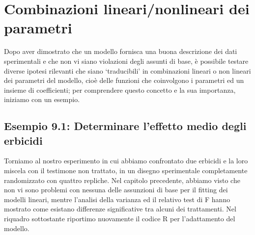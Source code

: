 \documentclass[
  12pt,
]{book}
\begin{document}
\hypertarget{combinazioni-linearinonlineari-dei-parametri}{%
\chapter{Combinazioni lineari/nonlineari dei parametri}\label{combinazioni-linearinonlineari-dei-parametri}}

Dopo aver dimostrato che un modello fornisca una buona descrizione dei dati sperimentali e che non vi siano violazioni degli assunti di base, è possibile testare diverse ipotesi rilevanti che siano `traducibili' in combinazioni lineari o non lineari dei parametri del modello, cioè delle funzioni che coinvolgono i parametri ed un insieme di coefficienti; per comprendere questo concetto e la sua importanza, iniziamo con un esempio.

\hypertarget{esempio-9.1-determinare-leffetto-medio-degli-erbicidi}{%
\section{Esempio 9.1: Determinare l'effetto medio degli erbicidi}\label{esempio-9.1-determinare-leffetto-medio-degli-erbicidi}}

Torniamo al nostro esperimento in cui abbiamo confrontato due erbicidi e la loro miscela con il testimone non trattato, in un disegno sperimentale completamente randomizzato con quattro repliche. Nel capitolo precedente, abbiamo visto che non vi sono problemi con nessuna delle assunzioni di base per il fitting dei modelli lineari, mentre l'analisi della varianza ed il relativo test di F hanno mostrato come esistano differenze significative tra alcuni dei trattamenti. Nel riquadro sottostante riportimo nuovamente il codice R per l'adattamento del modello.
\end{document}

